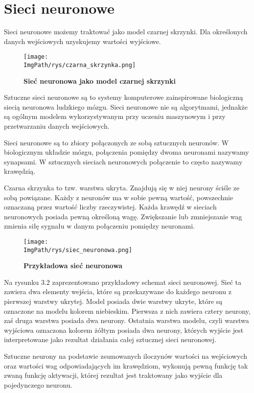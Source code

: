 \documentclass[a4paper,12pt,twoside,openany]{report}
\newcommand{\ImgPath}{.}
\begin{document}
\section{Sieci neuronowe}
Sieci neuronowe możemy traktować jako model czarnej skrzynki. Dla określonych danych wejściowych uzyskujemy wartości wyjściowe.

\begin{figure}[H]	
	\centering
	\texttt{[image: \\ImgPath/rys/czarna\_skrzynka.png]}
	
	\caption{  \textbf{Sieć neuronowa jako model czarnej skrzynki}}
\end{figure}

Sztuczne sieci neuronowe są to systemy komputerowe zainspirowane biologiczną siecią neuronowa ludzkiego mózgu. Sieci neuronowe nie są algorytmami, jednakże są ogólnym modelem wykorzystywanym przy uczeniu maszynowym i przy przetwarzaniu danych wejściowych.

Sieci neuronowe są to zbiory połączonych ze sobą sztucznych neuronów. W biologicznym układzie mózgu, połączenia pomiędzy dwoma neuronami nazywamy synapsami. W sztucznych sieciach neuronowych połączenie to często nazywamy krawędzią. 

Czarna skrzynka to tzw. warstwa ukryta. Znajdują się w niej neurony ściśle ze sobą powiązane. Każdy z neuronów ma w sobie pewną wartość, powszechnie oznaczaną przez wartość liczby rzeczywistej. Każda krawędź w sieciach neuronowych posiada pewną określoną wagę. Zwiększanie lub zmniejszanie wag zmienia siłę sygnału w danym połączeniu pomiędzy neuronami.

\begin{figure}[H]	
	\centering
	\texttt{[image: \\ImgPath/rys/siec\_neuronowa.png]}
	
	\caption{  \textbf{Przykładowa sieć neuronowa}}
\end{figure}

Na rysunku 3.2 zaprezentowano przykładowy schemat sieci neuronowej. Sieć ta zawiera dwa elementy wejścia, które są przekazywane do każdego neuronu z pierwszej warstwy ukrytej. Model posiada dwie warstwy ukryte, które są oznaczone na modelu kolorem niebieskim. Pierwsza z nich zawiera cztery neurony, zaś druga warstwa posiada dwa neurony. Ostatnia warstwa modelu, czyli warstwa wyjściowa oznaczona kolorem żółtym posiada dwa neurony, których wyjście jest interpretowane jako rezultat działania całej sztucznej sieci neuronowej.

Sztuczne neurony na podstawie zsumowanych iloczynów wartości na wejściowych oraz wartości wag odpowiadających im krawędziom, wykonują pewną funkcję tak zwaną funkcję aktywacji, której rezultat jest traktowany jako wyjście dla pojedynczego neuronu. 
\end{document}
